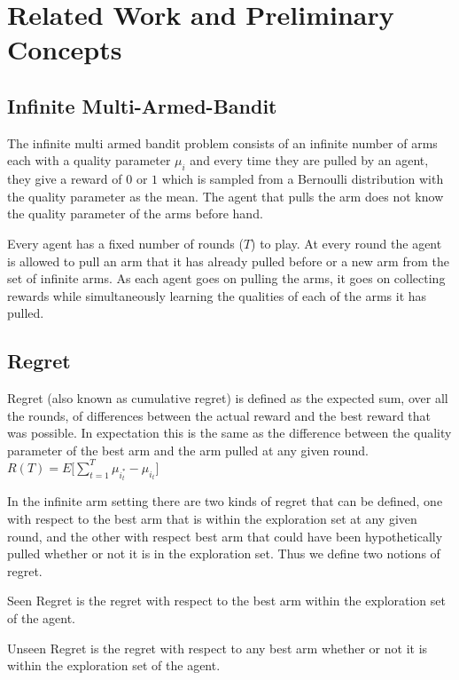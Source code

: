 \section{Related Work and Preliminary Concepts}

\subsection{Infinite Multi-Armed-Bandit}

The infinite multi armed bandit problem consists of an infinite number of arms each with a quality parameter $\mu_i$ and every time they are pulled by an agent, they give a reward of $0$ or $1$ which is sampled from a Bernoulli distribution with the quality parameter as the mean. The agent that pulls the arm does not know the quality parameter of the arms before hand.

Every agent has a fixed number of rounds ($T$) to play. At every round the agent is allowed to pull an arm that it has already pulled before or a new arm from the set of infinite arms. As each agent goes on pulling the arms, it goes on collecting rewards while simultaneously learning the qualities of each of the arms it has pulled.

\subsection{Regret}

Regret (also known as cumulative regret) is defined as the expected sum, over all the rounds, of differences between the actual reward and the best reward that was possible. In expectation this is the same as the difference between the quality parameter of the best arm and the arm pulled at any given round. $R(T) = E\lbrack  \sum^{T}_{t=1} \mu_{i_t^*} - \mu_{i_t}\rbrack$

In the infinite arm setting there are two kinds of regret that can be defined, one with respect to the best arm that is within the exploration set at any given round, and the other with respect best arm that could have been hypothetically pulled whether or not it is in the exploration set. Thus we define two notions of regret.


\begin{definition}
    Seen Regret is the regret with respect to the best arm within the exploration set of the agent.
\end{definition}

\begin{definition}
    Unseen Regret is the regret with respect to any best arm whether or not it is within the exploration set of the agent.
\end{definition}

